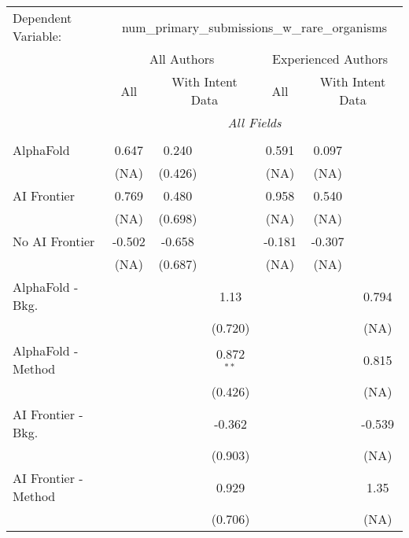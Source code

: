 \begingroup
\centering
\begin{tabular}{lcccccc}
   \tabularnewline \midrule \midrule
   Dependent Variable: & \multicolumn{6}{c}{num\_primary\_submissions\_w\_rare\_organisms}\\
 & \multicolumn{3}{c}{All Authors} & \multicolumn{3}{c}{Experienced Authors} \\
\cmidrule(lr){2-4} \cmidrule(lr){5-7}
 & \multicolumn{1}{c}{All} & \multicolumn{2}{c}{With Intent Data} & \multicolumn{1}{c}{All} & \multicolumn{2}{c}{With Intent Data} \\
\cmidrule(lr){2-2} \cmidrule(lr){3-4} \cmidrule(lr){5-5} \cmidrule(lr){6-7}
 & \multicolumn{6}{c}{\textit{All Fields}} \\ \\
   AlphaFold               & 0.647  & 0.240   &              & 0.591  & 0.097  &   \\   
                           & (NA)   & (0.426) &              & (NA)   & (NA)   &   \\   
   AI Frontier             & 0.769  & 0.480   &              & 0.958  & 0.540  &   \\   
                           & (NA)   & (0.698) &              & (NA)   & (NA)   &   \\   
   No AI Frontier          & -0.502 & -0.658  &              & -0.181 & -0.307 &   \\   
                           & (NA)   & (0.687) &              & (NA)   & (NA)   &   \\   
   AlphaFold - Bkg.        &        &         & 1.13         &        &        & 0.794\\   
                           &        &         & (0.720)      &        &        & (NA)\\   
   AlphaFold - Method      &        &         & 0.872$^{**}$ &        &        & 0.815\\   
                           &        &         & (0.426)      &        &        & (NA)\\   
   AI Frontier - Bkg.      &        &         & -0.362       &        &        & -0.539\\   
                           &        &         & (0.903)      &        &        & (NA)\\   
   AI Frontier - Method    &        &         & 0.929        &        &        & 1.35\\   
                           &        &         & (0.706)      &        &        & (NA)\\   

\end{tabular}
